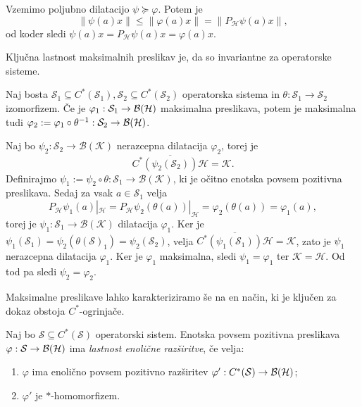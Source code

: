 \begin{dokaz}
    Vzemimo poljubno dilatacijo $\psi \succeq \varphi$.
    Potem je $$\| \psi(a) x \| \leq \| \varphi (a)x \| = \| P_\mathcal{H} \psi(a) x \|,$$
    od koder sledi $\psi(a) x = P_{\mathcal{H}} \psi(a) x = \varphi(a) x$.
\end{dokaz}

Ključna lastnost maksimalnih preslikav je, da so invariantne za operatorske sisteme.

\begin{trditev}\label{trd:2.2}
    Naj bosta $\mathcal{S}_1 \subseteq C^*(\mathcal{S}_1),  \mathcal{S}_2 \subseteq C^*(\mathcal{S}_2)$ operatorska sistema in $\theta: \mathcal{S}_1 \to \mathcal{S}_2$
    izomorfizem. Če je $\varphi_1: \mathcal{S}_1 \to \operatorname{\mathcal{B} (\mathcal{H})}$ maksimalna preslikava, potem je maksimalna
    tudi $\varphi_2 := \varphi_1 \circ \theta^{-1} : \mathcal{S}_2 \to \operatorname{\mathcal{B} (\mathcal{H})}$.
\end{trditev}

\begin{dokaz}
    Naj bo $\psi_2: \mathcal{S}_2 \to \mathcal{B}(\mathcal{K})$ nerazcepna dilatacija $\varphi_2$, torej je 
    $$\overline{C^* (\psi_2 (\mathcal{S}_2)) \mathcal{H}} = \mathcal{K}.$$
    Definirajmo $\psi_1 := \psi_2 \circ \theta: \mathcal{S}_1 \to \mathcal{B}(\mathcal{K})$, ki je očitno enotska povsem pozitivna preslikava.
    Sedaj za vsak $a \in \mathcal{S}_1$ velja 
    $$P_{\mathcal{H}} \psi_1 (a) |_{\mathcal{H}} = P_{\mathcal{H}} \psi_2 (\theta (a)) |_{\mathcal{H}} = \varphi_2 (\theta(a)) = \varphi_1 (a),$$
    torej je $\psi_1: \mathcal{S}_1 \to \mathcal{B}(\mathcal{K})$ dilatacija $\varphi_1$.
    Ker je $\psi_1 (\mathcal{S}_1) = \psi_2 (\theta(\mathcal{S})_1) = \psi_2 (\mathcal{S}_2)$, velja 
    $\overline{C^* (\psi_1 (\mathcal{S}_1)) \mathcal{H}} = \mathcal{K}$, zato je $\psi_1$ nerazcepna dilatacija $\varphi_1$. 
    Ker je $\varphi_1$ maksimalna, sledi $\psi_1 = \varphi_1$
    ter $\mathcal{K} = \mathcal{H}$. Od tod pa sledi $\psi_2 = \varphi_2$.
\end{dokaz}

Maksimalne preslikave lahko karakteriziramo še na en način, ki je ključen za dokaz obstoja $C^*$-ogrinjače.

\begin{definicija}
    Naj bo $\mathcal{S} \subseteq C^* (\mathcal{S})$ operatorski sistem.
    Enotska povsem pozitivna preslikava $\varphi: \mathcal{S} \to \operatorname{\mathcal{B} (\mathcal{H})}$ ima \emph{lastnost enolične razširitve}, če velja: 
    \begin{enumerate}
        \item $\varphi$ ima enolično povsem pozitivno razširitev $\varphi ': C^* (\mathcal{S}) \to \operatorname{\mathcal{B} (\mathcal{H})}$; 
        \item $\varphi'$ je $*$-homomorfizem.
    \end{enumerate}
\end{definicija}

